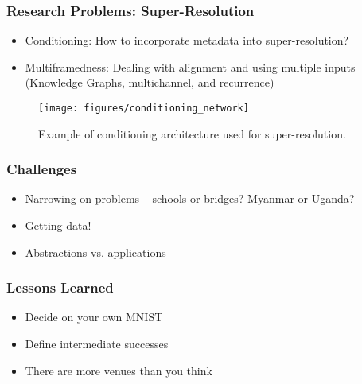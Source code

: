 \documentclass[10pt,mathserif]{beamer}
\begin{document}
\begin{frame}
  \frametitle{Research Problems: Super-Resolution}
  \begin{itemize}
  \item Conditioning: How to incorporate metadata into super-resolution?
  \item Multiframedness: Dealing with alignment and using multiple inputs
    (Knowledge Graphs, multichannel, and recurrence)
  \end{itemize}
  \begin{figure}[ht]
    \centering
    \texttt{[image: figures/conditioning\_network]}
    \caption{Example of conditioning architecture used for super-resolution. \label{fig:label} }
\end{figure}


\end{frame}

\begin{frame}
  \frametitle{Challenges}
  \begin{itemize}
  \item Narrowing on problems -- schools or bridges? Myanmar or Uganda?
  \item Getting data!
  \item Abstractions vs. applications
  \end{itemize}
\end{frame}

\begin{frame}
  \frametitle{Lessons Learned}
  \begin{itemize}
  \item Decide on your own MNIST
  \item Define intermediate successes
  \item There are more venues than you think
  \end{itemize}
\end{frame}
\end{document}
